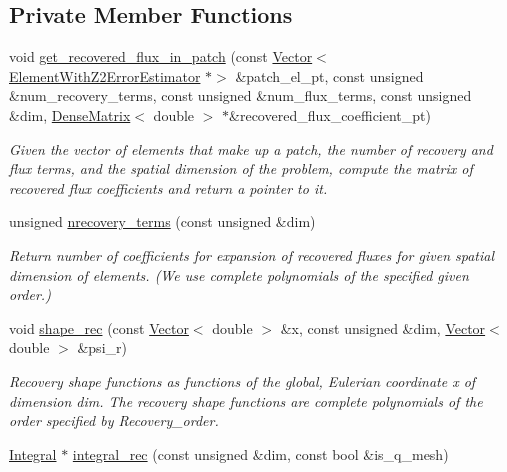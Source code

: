 \subsection*{Private Member Functions}
\begin{DoxyCompactItemize}
\item 
void \hyperlink{classoomph_1_1Z2ErrorEstimator_a2b6e14d5dcec19bd6cb97b5395f25579}{get\+\_\+recovered\+\_\+flux\+\_\+in\+\_\+patch} (const \hyperlink{classoomph_1_1Vector}{Vector}$<$ \hyperlink{classoomph_1_1ElementWithZ2ErrorEstimator}{Element\+With\+Z2\+Error\+Estimator} $\ast$$>$ \&patch\+\_\+el\+\_\+pt, const unsigned \&num\+\_\+recovery\+\_\+terms, const unsigned \&num\+\_\+flux\+\_\+terms, const unsigned \&dim, \hyperlink{classoomph_1_1DenseMatrix}{Dense\+Matrix}$<$ double $>$ $\ast$\&recovered\+\_\+flux\+\_\+coefficient\+\_\+pt)
\begin{DoxyCompactList}\small\item\em Given the vector of elements that make up a patch, the number of recovery and flux terms, and the spatial dimension of the problem, compute the matrix of recovered flux coefficients and return a pointer to it. \end{DoxyCompactList}\item 
unsigned \hyperlink{classoomph_1_1Z2ErrorEstimator_a1782984fa64738f9a8e7ca40d585597a}{nrecovery\+\_\+terms} (const unsigned \&dim)
\begin{DoxyCompactList}\small\item\em Return number of coefficients for expansion of recovered fluxes for given spatial dimension of elements. (We use complete polynomials of the specified given order.) \end{DoxyCompactList}\item 
void \hyperlink{classoomph_1_1Z2ErrorEstimator_ab57514ecde88f7ae970439fd4900996a}{shape\+\_\+rec} (const \hyperlink{classoomph_1_1Vector}{Vector}$<$ double $>$ \&x, const unsigned \&dim, \hyperlink{classoomph_1_1Vector}{Vector}$<$ double $>$ \&psi\+\_\+r)
\begin{DoxyCompactList}\small\item\em Recovery shape functions as functions of the global, Eulerian coordinate x of dimension dim. The recovery shape functions are complete polynomials of the order specified by Recovery\+\_\+order. \end{DoxyCompactList}\item 
\hyperlink{classoomph_1_1Integral}{Integral} $\ast$ \hyperlink{classoomph_1_1Z2ErrorEstimator_ac53b6d73d9e73140c92302c2aa70203a}{integral\+\_\+rec} (const unsigned \&dim, const bool \&is\+\_\+q\+\_\+mesh)
$$
\end{DoxyCompactItemize}
